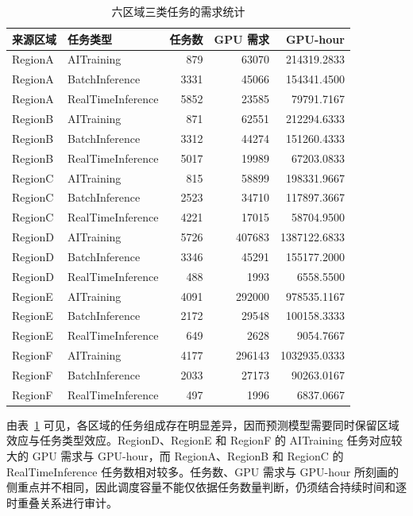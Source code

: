 \begin{table}[htbp]
\centering
\caption{六区域三类任务的需求统计}
\label{tab:q1_group_statistics}
\begin{tabular}{llrrr}
\toprule
来源区域 & 任务类型 & 任务数 & GPU 需求 & GPU-hour\\
\midrule
RegionA & AITraining & 879 & 63070 & 214319.2833\\
RegionA & BatchInference & 3331 & 45066 & 154341.4500\\
RegionA & RealTimeInference & 5852 & 23585 & 79791.7167\\
RegionB & AITraining & 871 & 62551 & 212294.6333\\
RegionB & BatchInference & 3312 & 44274 & 151260.4333\\
RegionB & RealTimeInference & 5017 & 19989 & 67203.0833\\
RegionC & AITraining & 815 & 58899 & 198331.9667\\
RegionC & BatchInference & 2523 & 34710 & 117897.3667\\
RegionC & RealTimeInference & 4221 & 17015 & 58704.9500\\
RegionD & AITraining & 5726 & 407683 & 1387122.6833\\
RegionD & BatchInference & 3346 & 45291 & 155177.2000\\
RegionD & RealTimeInference & 488 & 1993 & 6558.5500\\
RegionE & AITraining & 4091 & 292000 & 978535.1167\\
RegionE & BatchInference & 2172 & 29548 & 100158.3333\\
RegionE & RealTimeInference & 649 & 2628 & 9054.7667\\
RegionF & AITraining & 4177 & 296143 & 1032935.0333\\
RegionF & BatchInference & 2033 & 27173 & 90263.0167\\
RegionF & RealTimeInference & 497 & 1996 & 6837.0667\\
\bottomrule
\end{tabular}
\end{table}

由表~\ref{tab:q1_group_statistics} 可见，各区域的任务组成存在明显差异，因而预测模型需要同时保留区域效应与任务类型效应。RegionD、RegionE 和 RegionF 的 AITraining 任务对应较大的 GPU 需求与 GPU-hour，而 RegionA、RegionB 和 RegionC 的 RealTimeInference 任务数相对较多。任务数、GPU 需求与 GPU-hour 所刻画的侧重点并不相同，因此调度容量不能仅依据任务数量判断，仍须结合持续时间和逐时重叠关系进行审计。

